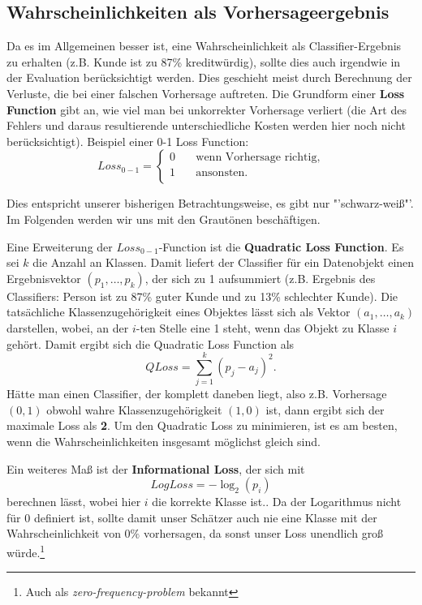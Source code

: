 \subsection{Wahrscheinlichkeiten als Vorhersageergebnis}
Da es im Allgemeinen besser ist, eine Wahrscheinlichkeit als Classifier-Ergebnis
zu erhalten (z.B. Kunde ist zu 87\% kreditwürdig), sollte dies auch irgendwie in
der Evaluation berücksichtigt werden. Dies geschieht meist durch Berechnung der
Verluste, die bei einer falschen Vorhersage auftreten. Die Grundform einer
\textbf{Loss Function} gibt an, wie viel man bei unkorrekter Vorhersage verliert
(die Art des Fehlers und daraus resultierende unterschiedliche Kosten werden hier
noch nicht berücksichtigt). Beispiel einer 0-1 Loss Function:
\[
	Loss_{0-1} = 
		\begin{cases}
			0 &\quad \text{wenn Vorhersage richtig,}\\
			1 &\quad \text{ansonsten.}\\
		\end{cases}
\]

Dies entspricht unserer bisherigen Betrachtungsweise, es gibt nur "'schwarz-weiß"'.
Im Folgenden werden wir uns mit den Grautönen beschäftigen.

Eine Erweiterung der \(Loss_{0-1}\)-Function
ist die \textbf{Quadratic Loss Function}. Es sei \(k\) die Anzahl
an Klassen. Damit liefert der Classifier für ein Datenobjekt
einen Ergebnisvektor \((p_1 , \dots , p_k)\),
der sich zu 1 aufsummiert
(z.B. Ergebnis des Classifiers: Person ist zu 87\% guter Kunde und zu 13\% schlechter
Kunde). Die tatsächliche Klassenzugehörigkeit eines Objektes lässt sich als
Vektor \((a_1, \dots , a_k)\) darstellen, wobei, an der \(i\)-ten Stelle eine 1 steht,
wenn das Objekt zu Klasse \(i\) gehört.
Damit ergibt sich die Quadratic Loss Function als
\[
	QLoss = \sum_{j=1}^k (p_j - a_j)^2.
\]
Hätte man einen Classifier, der komplett daneben liegt, also z.B. Vorhersage \((0,1)\)
obwohl wahre Klassenzugehörigkeit \((1,0)\) ist, dann ergibt sich der maximale Loss als
\textbf{2}. Um den Quadratic Loss zu minimieren, ist es am besten, wenn die 
Wahrscheinlichkeiten insgesamt möglichst gleich sind.

Ein weiteres Maß ist der \textbf{Informational Loss}, der sich mit 
\[
	LogLoss = -\log_2 (p_i)
\]
berechnen lässt, wobei hier \(i\) die korrekte Klasse ist..
Da der Logarithmus nicht für \(0\) definiert ist, sollte damit
unser Schätzer auch nie eine Klasse mit der Wahrscheinlichkeit von \(0\%\) vorhersagen,
da sonst unser Loss unendlich groß würde.\footnote{Auch als \textit{zero-frequency-problem}
bekannt}

